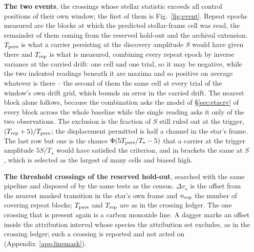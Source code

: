 \begin{table}
\centering
\caption{\textbf{The two events}, the crossings whose
stellar statistic exceeds all \NCtrl{} control positions of their own window;
the first of them is Fig.~\ref{fig:event}.
Repeat epochs measured are the blocks at which the predicted stellar-frame
cell was read, the remainder of them coming from the reserved hold-out and the
archival extension.
$T_{\rm pers}$ is what a carrier persisting at the discovery amplitude $S$
would have given there and $T_{\rm rep}$ is what is measured, combining every
repeat epoch by inverse variance at the carried drift: one cell and one
trial, so it may be negative, while the two indented readings beneath it are
maxima and so positive on average whatever is there -- the second of them
the same cell at every trial of the window's own drift grid, which bounds an
error in the carried drift. The nearest block alone
follows, because the combination asks the model of \S\ref{sec:etacrv} of
every block across the whole baseline while the single reading asks it only
of the two observations. The exclusion is the fraction of $S$ still
ruled out at the trigger, $(T_{\rm rep}+5)/T_{\rm pers}$; the displacement
permitted is half a channel in the star's frame. The last row but one is the
chance $\Phi(5T_{\rm pers}/T_\star-5)$ that a carrier at the trigger
amplitude $5S/T_\star$ would have satisfied the criterion, and in brackets the
same at $S$, which is selected as the largest of many cells and biased high.}
\label{tab:cand}
\footnotesize

\end{table}

\begin{table}
\centering
\caption{\textbf{The threshold crossings of the reserved hold-out}, searched
with the same pipeline and disposed of by the same tests as the
census. $\Delta v_\star$ is the offset from the nearest masked transition in
the star's own frame and $n_{\rm rep}$ the number of covering repeat blocks;
$T_{\rm pers}$ and $T_{\rm rep}$ are as in the crossing ledger. The one
crossing that is present again is a carbon monoxide line. A dagger marks an
offset inside the attribution interval whose species the attribution set
excludes, as in the crossing ledger; such a crossing is reported and not
acted on (Appendix~\ref{app:linemask}).}
\label{tab:holdout}
\scriptsize

\end{table}




